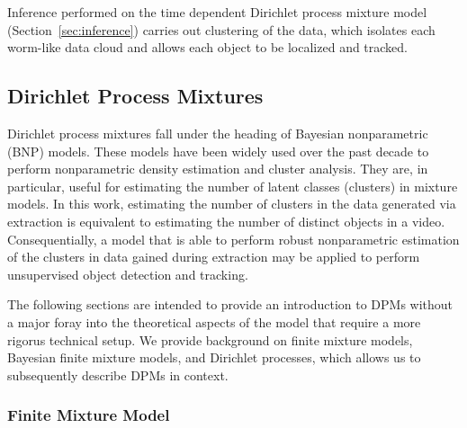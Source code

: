 \documentclass[smallcondensed, final]{svjour3}
\begin{document}
Inference performed on the time dependent Dirichlet process mixture model (Section~\ref{sec:inference}) carries out clustering of the data, which isolates each worm-like data cloud and allows each object to be localized and tracked.




\subsection{Dirichlet Process Mixtures}
\label{sec:dpm}

Dirichlet process mixtures fall under the heading of Bayesian nonparametric (BNP) models. These models have been widely used over the past decade to perform nonparametric density estimation and cluster analysis. They are, in particular, useful for estimating the number of latent classes (clusters) in mixture models. In this work, estimating the number of clusters in the data generated via extraction is equivalent to estimating the number of distinct objects in a video. Consequentially, a model that is able to perform robust nonparametric estimation of the clusters in data gained during extraction may be applied to perform unsupervised object detection and tracking.

The following sections are intended to provide an introduction to DPMs without a major foray into the theoretical aspects of the model that require a more rigorus technical setup. We provide background on finite mixture models, Bayesian finite mixture models, and Dirichlet processes, which allows us to subsequently describe DPMs in context. 






\subsubsection{Finite Mixture Model}
\label{sec:finite_mixture}
\end{document}
